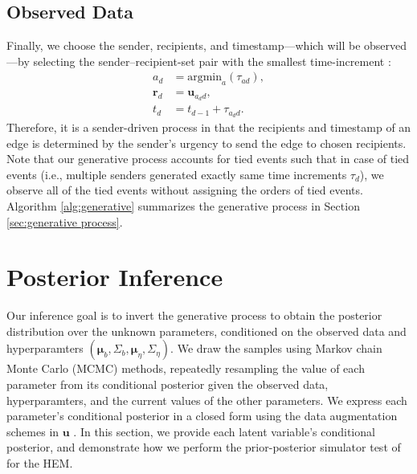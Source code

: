 \documentclass[ba]{imsart}
\numberwithin{equation}{section}
\theoremstyle{plain}
\begin{document}
\subsection{Observed Data}\label{subsec:Observed}
Finally, we choose the sender, recipients, and timestamp---which will be observed---by selecting the sender--recipient-set pair with the smallest time-increment \citep{snijders1996stochastic}:
\begin{equation}
\begin{aligned}
a_d &= \mbox{argmin}_{a}(\tau_{ad}),\\
\boldsymbol{r}_d &= \boldsymbol{u}_{a_d d},\\
t_d &=t_{d-1} + \tau_{a_d d}.
\end{aligned}
\end{equation}
Therefore, it is a sender-driven process in that the recipients and timestamp of an edge is determined by the sender's urgency to send the edge to chosen recipients. Note that  our generative process accounts for tied events such that in case of tied events (i.e., multiple senders generated exactly same time increments $\tau_d$), we observe all of the tied events without assigning the orders of tied events. Algorithm \ref{alg:generative} summarizes the generative process in Section \ref{sec:generative process}.
\section{Posterior Inference}\label{sec:inference}
Our inference goal is to invert the generative process to obtain the posterior distribution over the unknown parameters, conditioned on the observed data and hyperparamters $(\boldsymbol{\mu}_b, \Sigma_b, \boldsymbol{\mu}_\eta, \Sigma_\eta)$. We draw the samples using Markov chain Monte Carlo (MCMC) methods, repeatedly resampling the value of each parameter from its conditional posterior given the observed data, hyperparamters, and the current values of the other parameters. We express each parameter’s conditional posterior in a closed form using the data augmentation schemes in $\boldsymbol{u}$ \citep{tanner1987calculation}. In this section, we provide each latent variable's conditional posterior, and demonstrate how we perform the prior-posterior simulator test of \cite{geweke2004getting} for the HEM.
\end{document}

